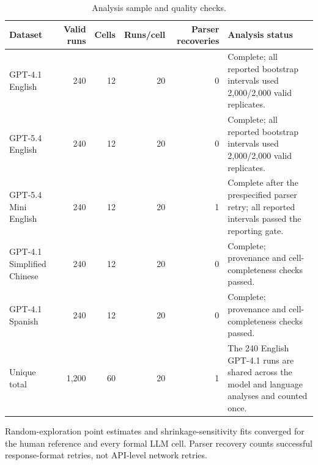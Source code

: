 \begin{table}[htbp]
\centering
\caption{Analysis sample and quality checks.}
\label{tab:results_quality}
\begin{tabularx}{\textwidth}{lrrrrX}
\toprule
Dataset & Valid runs & Cells & Runs/cell & Parser recoveries & Analysis status \\
\midrule
GPT-4.1 English & 240 & 12 & 20 & 0 & Complete; all reported bootstrap intervals used 2,000/2,000 valid replicates. \\
GPT-5.4 English & 240 & 12 & 20 & 0 & Complete; all reported bootstrap intervals used 2,000/2,000 valid replicates. \\
GPT-5.4 Mini English & 240 & 12 & 20 & 1 & Complete after the prespecified parser retry; all reported intervals passed the reporting gate. \\
GPT-4.1 Simplified Chinese & 240 & 12 & 20 & 0 & Complete; provenance and cell-completeness checks passed. \\
GPT-4.1 Spanish & 240 & 12 & 20 & 0 & Complete; provenance and cell-completeness checks passed. \\
\midrule
Unique total & 1,200 & 60 & 20 & 1 & The 240 English GPT-4.1 runs are shared across the model and language analyses and counted once. \\
\bottomrule
\end{tabularx}
\begin{flushleft}\footnotesize
Random-exploration point estimates and shrinkage-sensitivity fits converged for the human reference and every formal LLM cell. Parser recovery counts successful response-format retries, not API-level network retries.
\end{flushleft}
\end{table}

